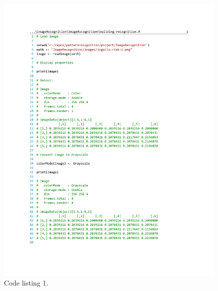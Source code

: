 \documentclass[conference,compsoc]{IEEEtran}
\begin{document}
\begin{figure}[!t]
\centering
\includegraphics[width=7in]{code-listing-1.pdf}
\caption{Code listing 1.}
\label{code-listing-1}
\end{figure}
\end{document}
